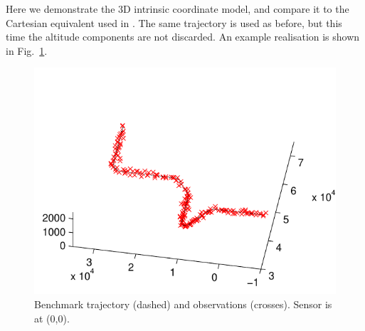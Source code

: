 \documentclass[conference]{IEEEtran}
\begin{document}
Here we demonstrate the 3D intrinsic coordinate model, and compare it to the Cartesian equivalent used in \cite{Whiteley2007a,Whiteley2011}. The same trajectory is used as before, but this time the altitude components are not discarded. An example realisation is shown in Fig.~\ref{fig:3D_ground_truth}.
%
\begin{figure}
\centering
\includegraphics[width=0.95\columnwidth]{images/3Dbenchmark_problem.pdf}
\caption{Benchmark trajectory (dashed) and observations (crosses). Sensor is at (0,0).}
\label{fig:3D_ground_truth}
\end{figure}
\end{document}
